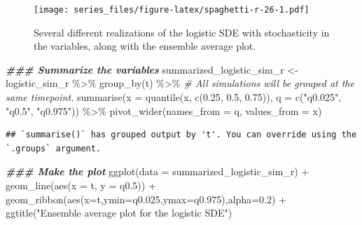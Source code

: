 \documentclass[
]{book}
\newenvironment{Shaded}{\begin{snugshade}}{\end{snugshade}}
\newcommand{\AttributeTok}[1]{\textcolor[rgb]{0.77,0.63,0.00}{#1}}
\newcommand{\CommentTok}[1]{\textcolor[rgb]{0.56,0.35,0.01}{\textit{#1}}}
\newcommand{\DocumentationTok}[1]{\textcolor[rgb]{0.56,0.35,0.01}{\textbf{\textit{#1}}}}
\newcommand{\FloatTok}[1]{\textcolor[rgb]{0.00,0.00,0.81}{#1}}
\newcommand{\FunctionTok}[1]{\textcolor[rgb]{0.00,0.00,0.00}{#1}}
\newcommand{\NormalTok}[1]{#1}
\newcommand{\OtherTok}[1]{\textcolor[rgb]{0.56,0.35,0.01}{#1}}
\newcommand{\SpecialCharTok}[1]{\textcolor[rgb]{0.00,0.00,0.00}{#1}}
\newcommand{\StringTok}[1]{\textcolor[rgb]{0.31,0.60,0.02}{#1}}
\theoremstyle{definition}
\theoremstyle{definition}
\theoremstyle{definition}
\theoremstyle{remark}
\begin{document}
\begin{figure}
\centering
\texttt{[image: series\_files/figure-latex/spaghetti-r-26-1.pdf]}
\caption{\label{fig:spaghetti-r-26-1}Several different realizations of the logistic SDE with stochasticity in the variables, along with the ensemble average plot.}
\end{figure}

\begin{Shaded}
\begin{Highlighting}[]
  \DocumentationTok{\#\#\# Summarize the variables}
\NormalTok{summarized\_logistic\_sim\_r }\OtherTok{\textless{}{-}}\NormalTok{ logistic\_sim\_r }\SpecialCharTok{\%\textgreater{}\%}
  \FunctionTok{group\_by}\NormalTok{(t) }\SpecialCharTok{\%\textgreater{}\%}  \CommentTok{\# All simulations will be grouped at the same timepoint.}
  \FunctionTok{summarise}\NormalTok{(}\AttributeTok{x =} \FunctionTok{quantile}\NormalTok{(x, }\FunctionTok{c}\NormalTok{(}\FloatTok{0.25}\NormalTok{, }\FloatTok{0.5}\NormalTok{, }\FloatTok{0.75}\NormalTok{)), }\AttributeTok{q =} \FunctionTok{c}\NormalTok{(}\StringTok{"q0.025"}\NormalTok{, }\StringTok{"q0.5"}\NormalTok{, }\StringTok{"q0.975"}\NormalTok{)) }\SpecialCharTok{\%\textgreater{}\%}
  \FunctionTok{pivot\_wider}\NormalTok{(}\AttributeTok{names\_from =}\NormalTok{ q, }\AttributeTok{values\_from =}\NormalTok{ x)}
\end{Highlighting}
\end{Shaded}

\begin{verbatim}
## `summarise()` has grouped output by 't'. You can override using the `.groups` argument.
\end{verbatim}

\begin{Shaded}
\begin{Highlighting}[]
\DocumentationTok{\#\#\# Make the plot}
\FunctionTok{ggplot}\NormalTok{(}\AttributeTok{data =}\NormalTok{ summarized\_logistic\_sim\_r) }\SpecialCharTok{+}
  \FunctionTok{geom\_line}\NormalTok{(}\FunctionTok{aes}\NormalTok{(}\AttributeTok{x =}\NormalTok{ t, }\AttributeTok{y =}\NormalTok{ q0}\FloatTok{.5}\NormalTok{)) }\SpecialCharTok{+}
  \FunctionTok{geom\_ribbon}\NormalTok{(}\FunctionTok{aes}\NormalTok{(}\AttributeTok{x=}\NormalTok{t,}\AttributeTok{ymin=}\NormalTok{q0}\FloatTok{.025}\NormalTok{,}\AttributeTok{ymax=}\NormalTok{q0}\FloatTok{.975}\NormalTok{),}\AttributeTok{alpha=}\FloatTok{0.2}\NormalTok{) }\SpecialCharTok{+}
  \FunctionTok{ggtitle}\NormalTok{(}\StringTok{"Ensemble average plot for the logistic SDE"}\NormalTok{)}
\end{Highlighting}
\end{Shaded}
\end{document}

